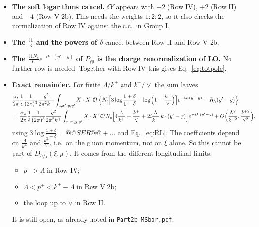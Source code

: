 \documentclass[10pt]{article}
\numberwithin{equation}{section}
\newcommand{\OO}{\mathcal O}
\newcommand{\pre}{\frac{1}{(2\pi)^3}\frac{g^2}{2\pi^2k^+}}
\begin{document}
\begin{itemize}
\item \textbf{The soft logarithms cancel.} $\delta Y$ appears with $+2$ (Row IV), $+2$ (Row II) and $-4$ (Row V 2b). This needs the weights $1:2:2$, so it also checks the normalization of Row IV against the c.c.\ in Group I.
\item \textbf{The $\frac{11}{3}$ and the powers of $\delta$} cancel between Row II and Row V 2b.
\item \textbf{The $\frac{11N_c}{6}e^{-ik\cdot(y'-y)}$ of $P_{gg}$ is the charge renormalization of LO.} No further row is needed. Together with Row IV this gives Eq.~\eqref{eq:totpole}.
\item \textbf{Exact remainder.} For finite $\Lambda/k^+$ and $k^+/\vee$ the sum leaves
\begin{align}
&\frac{\alpha_s}{2\pi}\frac{1}{\bar\epsilon}\pre\int_{x,x',y,y'}X\cdot X'\,\OO\,\Big\{N_c\Big[3\log\frac{1+\delta}{1-\delta}-\log\Big(1-\frac{k^+}{\vee}\Big)\Big]e^{-ik\cdot(y'-y)}-R_\Lambda(y'-y)\Big\}\notag\\
&=\frac{\alpha_s}{2\pi}\frac{1}{\bar\epsilon}\pre\int_{x,x',y,y'}X\cdot X'\,\OO\,N_c\Big[4\frac{\Lambda}{k^+}+\frac{k^+}{\vee}+2i\frac{\Lambda}{k^+}\,k\cdot(y'-y)\Big]e^{-ik\cdot(y'-y)}+O\Big(\frac{\Lambda^2}{k^{+2}},\frac{k^{+2}}{\vee^2}\Big),
\end{align}
using $3\log\frac{1+\delta}{1-\delta}=@@SER@@+\dots$ and Eq.~\eqref{eq:RL}. The coefficients depend on $\frac{\Lambda}{k^+}$ and $\frac{k^+}{\vee}$, i.e.\ on the gluon momentum, not on $\xi$ alone. So this cannot be part of $D_{h/g}(\xi,\mu)$. It comes from the different longitudinal limits:
\begin{itemize}
\item $p^+>\Lambda$ in Row IV;
\item $\Lambda<p^+<k^+-\Lambda$ in Row V 2b;
\item the loop up to $\vee$ in Row II.
\end{itemize}
It is still open, as already noted in \texttt{Part2b\_MSbar.pdf}.
\end{itemize}

\end{document}
